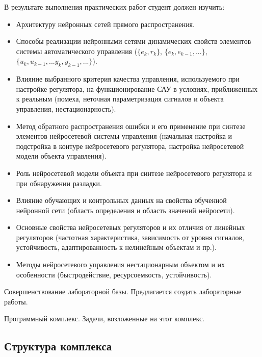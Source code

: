 В результате выполнения практических работ студент должен изучить:
\begin{itemize}

\item Архитектуру нейронных сетей прямого распространения.

\item Способы реализации нейронными сетями динамических свойств
  элементов системы автоматического управления ($\{{e_k,r_k}\}$,
  $\{e_k,e_{k-1},...\}$, $\{u_k,u_{k-1},...y_k,y_{k-1},...\}$).

\item Влияние выбранного критерия качества управления, используемого
  при настройке регулятора, на функционирование САУ в условиях,
  приближенных к реальным (помеха, неточная параметризация сигналов и
  объекта управления, нестационарность).

\item Метод обратного распространения ошибки и его применение при
  синтезе элементов нейросетевой системы управления (начальная
  настройка и подстройка в контуре нейросетевого регулятора, настройка
  нейросетевой модели объекта управления).

\item Роль нейросетевой модели объекта при синтезе нейросетевого
  регулятора и при обнаружении разладки.

\item Влияние обучающих и контрольных данных на свойства обученной
  нейронной сети (область определения и область значений нейросети).

\item Основные свойства нейросетевых регуляторов и их отличия от
  линейных регуляторов (частотная характеристика, зависимость от
  уровня сигналов, устойчивость, адаптированность к нелинейным
  объектам и пр.).

\item Методы нейросетевого управления нестационарным объектом и их
  особенности (быстродействие, ресурсоемкость, устойчивость).

\end{itemize}

Совершенствование лабораторной базы.  Предлагается создать лабораторные работы.

Программный комплекс.
Задачи, возложенные на этот комплекс.

\subsection{Структура комплекса}

